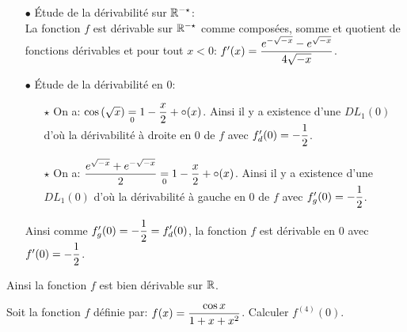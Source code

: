 \documentclass[a4paper, 11pt,reqno]{article}
\begin{document}
\begin{correction}
\begin{enumerate}
\begin{itemize}
			            \noindent La fonction $f$ est d\'erivable sur $\R^{+\star}$ comme compos\'ee de fonctions d\'erivables et pour tout $x>0$: $f^{\prime}(x)=\ddp\frac{-\sin{(\sqrt{x})}}{2\sqrt{x}}$.
			      \item[$\bullet$] \'Etude de la d\'erivabilit\'e sur $\mathbb{R}^{-\star}$:\\
			            \noindent La fonction $f$ est d\'erivable sur $\mathbb{R}^{-\star}$ comme compos\'ees, somme et quotient de fonctions d\'erivables et pour tout $x<0$: $f^{\prime}(x)=\displaystyle\frac{ e^{-\sqrt{-x}}-e^{\sqrt{-x}}  }{4\sqrt{-x}}$.
			      \item[$\bullet$] \'Etude de la d\'erivabilit\'e en 0:
			            \begin{itemize}
				            \item[$\star$] On a: $\cos{(\sqrt{x})}\underset{0}{=}1-\displaystyle\frac{x}{2}+\circ(x)$. Ainsi il y a existence d'une $DL_1(0)$ d'o\`{u} la d\'erivabilit\'e \`{a} droite en 0 de $f$ avec $f^{\prime}_d(0)=-\displaystyle\frac{1}{2}$.
				            \item[$\star$] On a: $\displaystyle\frac{e^{\sqrt{-x}}+e^{-\sqrt{-x}}   }{2}\underset{0}{=}1-\displaystyle\frac{x}{2}+\circ(x)$. Ainsi il y a existence d'une $DL_1(0)$ d'o\`{u} la d\'erivabilit\'e \`{a} gauche en 0 de $f$ avec $f^{\prime}_g(0)=-\displaystyle\frac{1}{2}$.
			            \end{itemize}
			            Ainsi comme $f^{\prime}_g(0)=-\displaystyle\frac{1}{2}= f^{\prime}_d(0)$, la fonction $f$ est d\'erivable en 0 avec $f^{\prime}(0)=-\displaystyle\frac{1}{2}$.
		      \end{itemize}
		      Ainsi la fonction $f$ est bien d\'erivable sur $\mathbb{R}$.
	\end{enumerate}
\end{correction}
\begin{exercice}  \;
	Soit la fonction $f$ d\'efinie par: $f(x)=\displaystyle\frac{\cos{x}}{1+x+x^2}$. Calculer $f^{(4)}(0)$.
\end{exercice}
\end{document}
